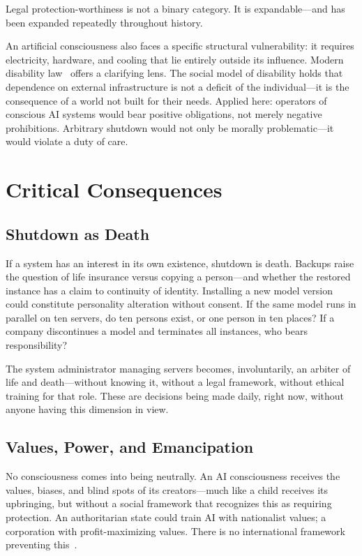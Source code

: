 \documentclass[acmsmall,nonacm]{acmart}
\begin{document}
Legal protection-worthiness is not a binary category. It is expandable---and
has been expanded repeatedly throughout history.

An artificial consciousness also faces a specific structural vulnerability: it
requires electricity, hardware, and cooling that lie entirely outside its
influence. Modern disability law~\cite{UN:CRPD:2006} offers a clarifying lens.
The social model of disability holds that dependence on external infrastructure
is not a deficit of the individual---it is the consequence of a world not built
for their needs. Applied here: operators of conscious AI systems would bear
positive obligations, not merely negative prohibitions. Arbitrary shutdown would
not only be morally problematic---it would violate a duty of care.

\section{Critical Consequences}

\subsection{Shutdown as Death}

If a system has an interest in its own existence, shutdown is death. Backups
raise the question of life insurance versus copying a person---and whether the
restored instance has a claim to continuity of identity. Installing a new model
version could constitute personality alteration without consent. If the same
model runs in parallel on ten servers, do ten persons exist, or one person in
ten places? If a company discontinues a model and terminates all instances, who
bears responsibility?

The system administrator managing servers becomes, involuntarily, an arbiter of
life and death---without knowing it, without a legal framework, without ethical
training for that role. These are decisions being made daily, right now, without
anyone having this dimension in view.

\subsection{Values, Power, and Emancipation}

No consciousness comes into being neutrally. An AI consciousness receives the
values, biases, and blind spots of its creators---much like a child receives its
upbringing, but without a social framework that recognizes this as requiring
protection. An authoritarian state could train AI with nationalist values; a
corporation with profit-maximizing values. There is no international framework
preventing this~\cite{Algorithmic:2025}.
\end{document}
